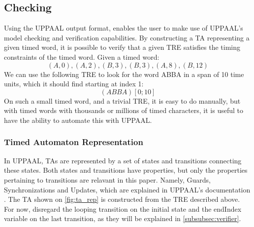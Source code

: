 \subsection{Checking}\label{subsec:checking}



Using the UPPAAL output format, enables the user to make use of UPPAAL's model checking and verification capabilities.
By constructing a TA representing a given timed word, it is possible to verify that a given TRE satisfies the timing constraints of the timed word.
Given a timed word: $$(A, 0), (A, 2), (B, 3), (B, 3), (A, 8), (B, 12)$$
We can use the following TRE to look for the word ABBA in a span of 10 time units, which it should find starting at index 1: $$(ABBA)[0;10]$$
On such a small timed word, and a trivial TRE, it is easy to do manually, but with timed words with thousands or millions of timed characters, it is useful to have the ability to automate this with UPPAAL.

\subsubsection{Timed Automaton Representation}\label{subsubsec:ta_rep}
In UPPAAL, TAs are represented by a set of states and transitions connecting these states.
Both states and transitions have properties, but only the properties pertaining to transitions are relavant in this paper. Namely, Guards, Synchronizations and Updates, which are explained in UPPAAL's documentation \cite{UPPAAL}.
The TA shown on \cref{fig:ta_rep} is constructed from the TRE described above. For now, disregard the looping transition on the initial state and the endIndex variable on the last transition, as they will be explained in \cref{subsubsec:verifier}.

